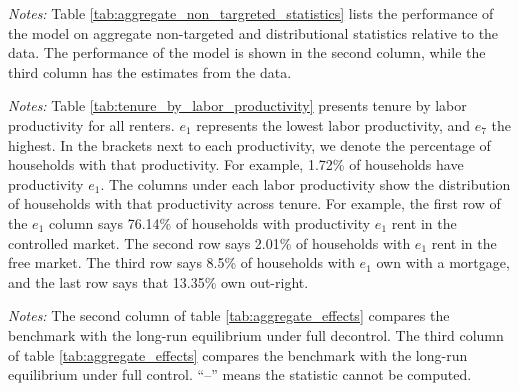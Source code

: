 \documentclass[parskip=full]{article}
\newenvironment{fignote2}[1]
{
\par
\medskip
\begin{minipage}{#1}
\footnotesize
}
{
\end{minipage}
}
\begin{document}
\begin{table}[H]
    \centering
    \caption{Aggregate non-targeted statistics}
    \vspace{-0.5cm}
    \label{tab:aggregate_non_targreted_statistics}  
    \vspace{-0.45cm}
    \begin{fignote2}{0.91\textwidth}
      \textit{Notes:} Table \ref{tab:aggregate_non_targreted_statistics} lists the performance of the model on aggregate non-targeted and distributional statistics relative to the data. The performance of the model is shown in the second column, while the third column has the estimates from the data. 
    \end{fignote2}
\end{table}

\begin{table}[H]
    \centering
    \caption{Tenure by labor productivity for all households in benchmark}
    \vspace{-0.5cm}
    \label{tab:tenure_by_labor_productivity}    
    \vspace{-0.45cm}
    \begin{fignote2}{0.97\textwidth}
      \textit{Notes:} Table \ref{tab:tenure_by_labor_productivity} presents tenure by labor productivity for all renters. $e_{1}$ represents the lowest labor productivity, and $e_{7}$ the highest. In the brackets next to each productivity, we denote the percentage of households with that productivity. For example, 1.72\% of households have productivity $e_{1}$. The columns under each labor productivity show the distribution of households with that productivity across tenure. For example, the first row of the $e_{1}$ column says 76.14\% of households with productivity $e_{1}$ rent in the controlled market. The second row says 2.01\% of households with $e_{1}$ rent in the free market. The third row says 8.5\% of households with $e_{1}$ own with a mortgage, and the last row says that 13.35\% own out-right.
    \end{fignote2}
\end{table}

\begin{table}[H]
    \centering
    \caption{Aggregate effects}
    \vspace{-0.5cm}
    \label{tab:aggregate_effects}
    
    \vspace{-0.45cm}
    \begin{fignote2}{0.67\textwidth}
      \textit{Notes:} The second column of table \ref{tab:aggregate_effects} compares the benchmark with the long-run equilibrium under full decontrol. The third column of table \ref{tab:aggregate_effects} compares the benchmark with the long-run equilibrium under full control. “--” means the statistic cannot be computed.
    \end{fignote2}
\end{table}
\end{document}
